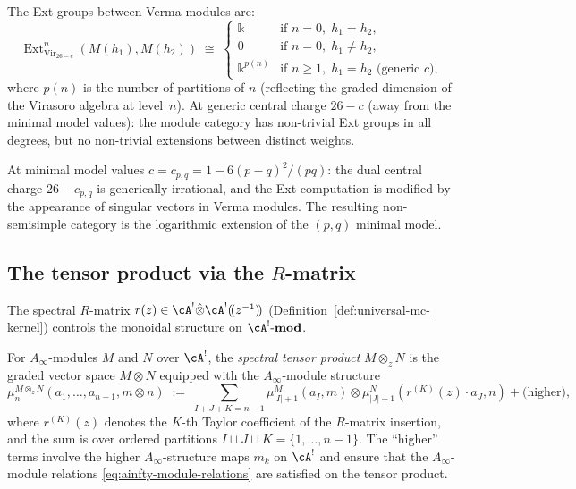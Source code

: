 \begin{computation}
The Ext groups between Verma modules are:
\begin{equation}
\operatorname{Ext}^n_{\mathrm{Vir}_{26-c}}
(M(h_1),M(h_2))
\;\cong\;
\begin{cases}
\Bbbk & \text{if } n=0,\;h_1=h_2, \\
0 & \text{if } n=0,\;h_1\ne h_2, \\
\Bbbk^{p(n)} & \text{if } n\ge 1,\;h_1=h_2
 \text{ (generic $c$)},
\end{cases}
\end{equation}
where $p(n)$ is the number of partitions of $n$
(reflecting the graded dimension of the Virasoro algebra
at level~$n$). At generic central charge $26-c$
(away from the minimal model values): the module category
has non-trivial Ext groups in all degrees, but no
non-trivial extensions between distinct weights.

At minimal model values $c=c_{p,q}=1-6(p-q)^2/(pq)$:
the dual central charge $26-c_{p,q}$ is generically
irrational, and the Ext computation is modified by the
appearance of singular vectors in Verma modules. The
resulting non-semisimple category is the logarithmic
extension of the $(p,q)$ minimal model.
\end{computation}

\subsection{The tensor product via the $R$-matrix}

The spectral $R$-matrix
$r(z)\in\cA^!\hat\otimes\cA^!(\!(z^{-1})\!)$
(Definition~\ref{def:universal-mc-kernel}) controls the monoidal structure on $\cA^!\text{-}\mathbf{mod}$.

\begin{definition}
For $A_\infty$-modules $M$ and $N$ over $\cA^!$, the
\emph{spectral tensor product}
$M\otimes_z N$ is the graded vector space $M\otimes N$
equipped with the $A_\infty$-module structure
\begin{equation}
\mu_n^{M\otimes_z N}(a_1,\ldots,a_{n-1},m\otimes n)
\;:=\;
\sum_{I+J+K=n-1}
\mu_{|I|+1}^M(a_I,m)
\otimes
\mu_{|J|+1}^N(r^{(K)}(z)\cdot a_J,n)
+\text{(higher)},
\end{equation}
where $r^{(K)}(z)$ denotes the $K$-th Taylor coefficient
of the $R$-matrix insertion, and the sum is over ordered
partitions $I\sqcup J\sqcup K=\{1,\ldots,n-1\}$. The
``higher'' terms involve the higher $A_\infty$-structure
maps $m_k$ on $\cA^!$ and ensure that the
$A_\infty$-module relations
\eqref{eq:ainfty-module-relations} are satisfied on the
tensor product.
\end{definition}

